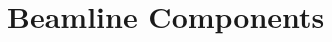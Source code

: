 %
%
%
%
%
%
%
%
%
%
%
%
%
%
%
%
%
%
%
%
%
%
%

\section{Beamline Components}
\setcounter{figure}{0}
\setcounter{table}{0}
\setcounter{equation}{0}

